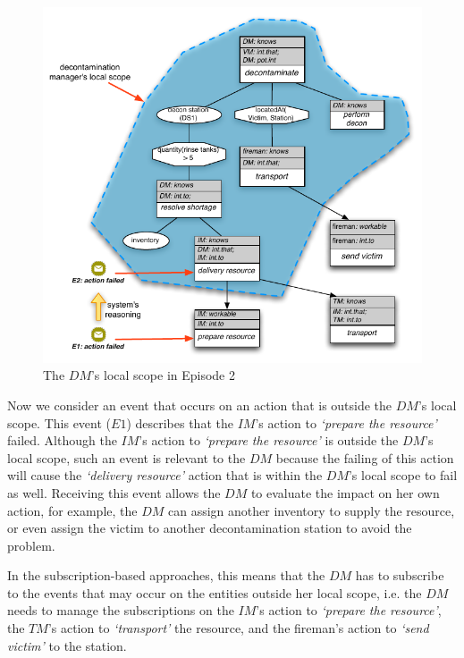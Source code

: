 \begin{figure}[htbp] %
	\centering
	\includegraphics{case_1_dm.pdf} 
	\caption{The $DM$'s local scope in Episode 2}
	\label{fig:case_1_dm}
\end{figure}

Now we consider an event that occurs on an action that is outside the $DM$'s local scope. This event ($E1$) describes that the $IM$'s action to \emph{`prepare the resource'} failed. Although the $IM$'s action to \emph{`prepare the resource'} is outside the $DM$'s local scope, such an event is relevant to the $DM$ because the failing of this action will cause the \emph{`delivery resource'} action that is within the $DM$'s local scope to fail as well. Receiving this event allows the $DM$ to evaluate the impact on her own action, for example, the $DM$ can assign another inventory to supply the resource, or even assign the victim to another decontamination station to avoid the problem. 

In the subscription-based approaches, this means that the $DM$ has to subscribe to the events that may occur on the entities outside her local scope, i.e. the $DM$ needs to manage the subscriptions on the $IM$'s action to \emph{`prepare the resource'}, the $TM$'s action to \emph{`transport'} the resource, and the fireman's action to \emph{`send victim'} to the station.

